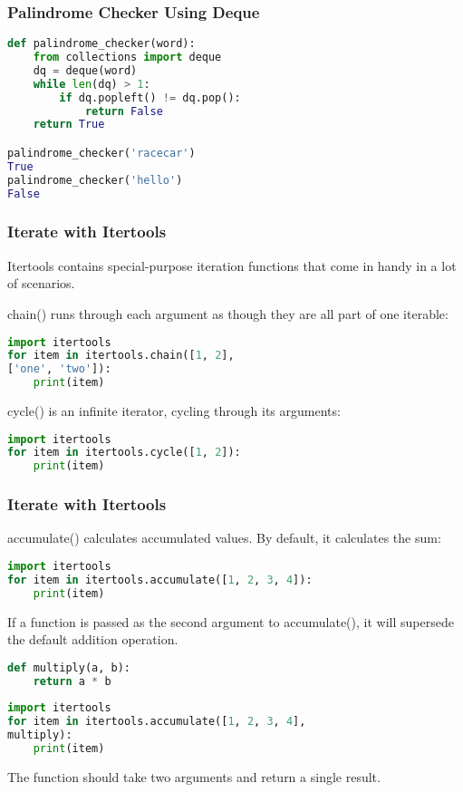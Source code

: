 \documentclass{beamer}
\begin{document}
\begin{frame}[fragile]
\frametitle{Palindrome Checker Using Deque}
\begin{lstlisting}[language=Python]
def palindrome_checker(word):
    from collections import deque
    dq = deque(word)
    while len(dq) > 1:
        if dq.popleft() != dq.pop():
            return False
    return True

palindrome_checker('racecar')
True
palindrome_checker('hello')
False
\end{lstlisting}
\end{frame}

\begin{frame}[fragile]
\frametitle{Iterate with Itertools}
Itertools contains special-purpose iteration functions that come in handy in a lot of scenarios.

chain() runs through each argument as though they are all part of one iterable:

\begin{lstlisting}[language=Python]
import itertools
for item in itertools.chain([1, 2], 
['one', 'two']):
	print(item)
\end{lstlisting}

cycle() is an infinite iterator, cycling through its arguments:
\begin{lstlisting}[language=Python]
import itertools
for item in itertools.cycle([1, 2]):
    print(item)
\end{lstlisting}

\end{frame}


\begin{frame}[fragile]
\frametitle{Iterate with Itertools}

accumulate() calculates accumulated values. By default, it calculates the sum:

\begin{lstlisting}[language=Python]
import itertools
for item in itertools.accumulate([1, 2, 3, 4]):
    print(item)
\end{lstlisting}

If a function is passed as the second argument to accumulate(), it will supersede the default addition operation.
\begin{lstlisting}[language=Python]
def multiply(a, b):
    return a * b
    
import itertools
for item in itertools.accumulate([1, 2, 3, 4],
multiply):
    print(item)
\end{lstlisting}
The function should take two arguments and return a single result.
\end{frame}
\end{document}
